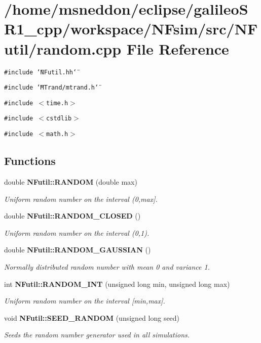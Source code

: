 \section{/home/msneddon/eclipse/galileoSR1\_\-cpp/workspace/NFsim/src/NFutil/random.cpp File Reference}
\label{random_8cpp}


{\tt \#include \char`\"{}NFutil.hh\char`\"{}}\par
{\tt \#include \char`\"{}MTrand/mtrand.h\char`\"{}}\par
{\tt \#include $<$time.h$>$}\par
{\tt \#include $<$cstdlib$>$}\par
{\tt \#include $<$math.h$>$}\par
\subsection*{Functions}
\begin{CompactItemize}
\item 
double {\bf NFutil::RANDOM} (double max)
\begin{CompactList}\small\item\em Uniform random number on the interval (0,max]. \item\end{CompactList}\item 
double {\bf NFutil::RANDOM\_\-CLOSED} ()
\begin{CompactList}\small\item\em Uniform random number on the interval (0,1). \item\end{CompactList}\item 
double {\bf NFutil::RANDOM\_\-GAUSSIAN} ()
\begin{CompactList}\small\item\em Normally distributed random number with mean 0 and variance 1. \item\end{CompactList}\item 
int {\bf NFutil::RANDOM\_\-INT} (unsigned long min, unsigned long max)
\begin{CompactList}\small\item\em Uniform random number on the interval [min,max]. \item\end{CompactList}\item 
void {\bf NFutil::SEED\_\-RANDOM} (unsigned long seed)
\begin{CompactList}\small\item\em Seeds the random number generator used in all simulations. \item\end{CompactList}\end{CompactItemize}
